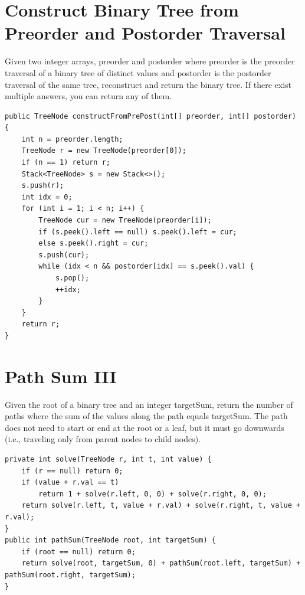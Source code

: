 \documentclass[9pt, b5paaper]{book}
\begin{document}
\section{Construct Binary Tree from Preorder and Postorder Traversal}
\label{sec-22-3}
Given two integer arrays, preorder and postorder where preorder is the preorder traversal of a binary tree of distinct values and postorder is the postorder traversal of the same tree, reconstruct and return the binary tree.
If there exist multiple answers, you can return any of them.
\begin{verbatim}
public TreeNode constructFromPrePost(int[] preorder, int[] postorder) {
    int n = preorder.length;
    TreeNode r = new TreeNode(preorder[0]);
    if (n == 1) return r;
    Stack<TreeNode> s = new Stack<>();
    s.push(r);
    int idx = 0;
    for (int i = 1; i < n; i++) {
        TreeNode cur = new TreeNode(preorder[i]);
        if (s.peek().left == null) s.peek().left = cur;
        else s.peek().right = cur;
        s.push(cur);
        while (idx < n && postorder[idx] == s.peek().val) {
            s.pop();
            ++idx;
        }
    }
    return r;
}
\end{verbatim}

\section{Path Sum III}
\label{sec-22-4}
Given the root of a binary tree and an integer targetSum, return the number of paths where the sum of the values along the path equals targetSum.
The path does not need to start or end at the root or a leaf, but it must go downwards (i.e., traveling only from parent nodes to child nodes).
\begin{verbatim}
private int solve(TreeNode r, int t, int value) {
    if (r == null) return 0;
    if (value + r.val == t)
        return 1 + solve(r.left, 0, 0) + solve(r.right, 0, 0);
    return solve(r.left, t, value + r.val) + solve(r.right, t, value + r.val);
}
public int pathSum(TreeNode root, int targetSum) {
    if (root == null) return 0;
    return solve(root, targetSum, 0) + pathSum(root.left, targetSum) + pathSum(root.right, targetSum);
}
\end{verbatim}
\end{document}
